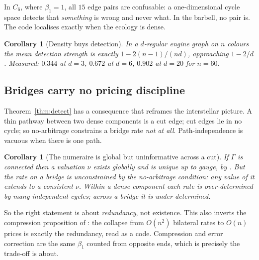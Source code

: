 \documentclass[11pt]{article}
\theoremstyle{plain}
\newtheorem{corollary}[theorem]{Corollary}
\theoremstyle{definition}
\theoremstyle{remark}
\newcommand{\bt}{\beta_1}
\begin{document}
In $C_6$, where $\bt = 1$, all $15$ edge pairs are confusable: a
one-dimensional cycle space detects that \emph{something} is wrong and
never what. In the barbell, no pair is. The code localises exactly when the
ecology is dense.

\begin{corollary}[Density buys detection]\label{cor:density}
In a $d$-regular engine graph on $n$ colours the mean detection strength is
exactly $1 - 2(n-1)/(nd)$, approaching $1 - 2/d$. Measured: $0.344$ at
$d=3$, $0.672$ at $d=6$, $0.902$ at $d=20$ for $n=60$.
\end{corollary}

\subsection{Bridges carry no pricing discipline}
\label{sec:bridge}

Theorem~\ref{thm:detect} has a consequence that reframes the interstellar
picture. A thin pathway between two dense components is a cut edge; cut
edges lie in no cycle; so no-arbitrage constrains a bridge rate \emph{not
at all}. Path-independence is vacuous when there is one path.

\begin{corollary}[The numeraire is global but uninformative across a cut]
If $\Gamma$ is connected then a valuation $\nu$ exists globally and is
unique up to gauge, by \cite[Thm.~3.3]{vtok}. But the rate on a bridge is
unconstrained by the no-arbitrage condition: any value of it extends to a
consistent $\nu$. Within a dense component each rate is over-determined by
many independent cycles; across a bridge it is under-determined.
\end{corollary}

So the right statement is about \emph{redundancy}, not existence. This also
inverts the compression proposition of \cite[\S5]{vtok}: the collapse from
$O(n^2)$ bilateral rates to $O(n)$ prices is exactly the redundancy, read
as a code. Compression and error correction are the same $\bt$ counted from
opposite ends, which is precisely the trade-off \cite{compaut} is about.
\end{document}
